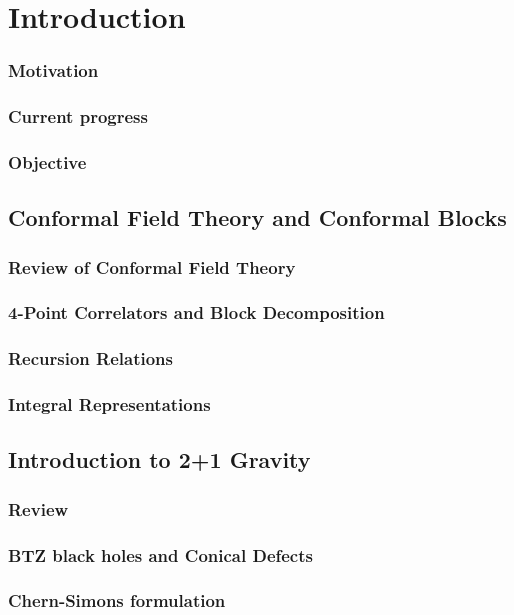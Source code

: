 \tableofcontents
\newpage
  \chapter{Introduction}
  \subsection{Motivation}
  \subsection{Current progress}
  \subsection{Objective}
  \section{Conformal Field Theory and Conformal Blocks}
  \subsection{Review of Conformal Field Theory}
  \subsection{4-Point Correlators and Block Decomposition}
  \subsection{Recursion Relations}
  \subsection{Integral Representations}
  \section{Introduction to 2+1 Gravity}
  \subsection{Review}
  \subsection{BTZ black holes and Conical Defects}
  \subsection{Chern-Simons formulation}
